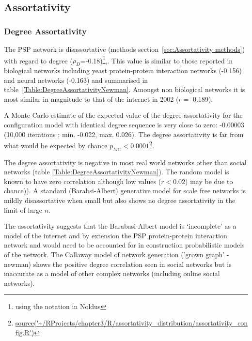 \clearpage

\subsection{ Assortativity }
\subsubsection{Degree Assortativity}


 The PSP network is disassortative (methods section~\ref{sec:Assortativity methods}) with regard to degree ($\rho_D$=-0.18)\footnote{using the notation in Noldus\cite{noldus2015assortativity}},. 
 This value  %
 is similar to those reported in biological networks including yeast protein-protein interaction networks (-0.156) and neural networks (-0.163) \cite{newman2002assortative}  and summarised in table~\ref{Table:DegreeAssortativityNewman}. Amongst non biological networks it is most similar in magnitude to that of the internet in 2002\cite{newman2002assortative} ($r=$-0.189). 

 A Monte Carlo estimate of the expected value of the degree assortativity for the configuration model with identical degree sequence is very close to zero: -0.00003 (10,000 iterations ; min. -0.022, max.  0.026). The degree assortativity is far from what would be expected by chance  $p_{MC}<0.0001$\footnote{\url{source('~/RProjects/chapter3/R/assortativity_distribution/assortativity_config.R')}}.

The degree assortativity is negative in most real world networks other than social networks (table \ref{Table:DegreeAssortativityNewman})\cite{newman2002assortative}. The random model is known to have zero correlation although low values ($r<0.02$) may be due to chance)\cite{noldus2015assortativity}). A standard (Barabsi-Albert) generative model for scale free networks is  mildly disassortative\cite{noldus2015assortativity} when small but also shows no degree assortativity in the limit of large $n$\cite{noldus2015assortativity}. 

The assortativity suggests that the Barabasi-Albert model is `incomplete' as a model of the internet \cite{newman2002assortative} and by extension the PSP protein-protein interaction network and would need to be accounted for in construction probabilistic models of the network. 
The Callaway model of network generation ('grown graph' - newman) shows the positive degree correlation seen in social networks but is inaccurate as a model of other complex networks (including online social networks). 


